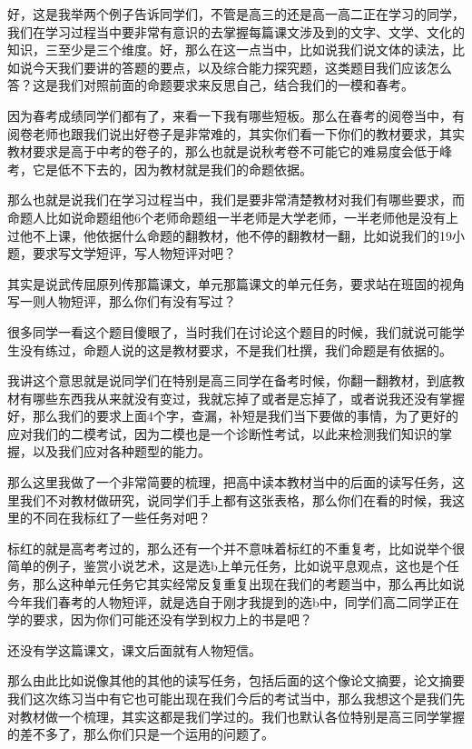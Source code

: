 \documentclass{ctexart}
\renewcommand{\\}{\par}
\begin{document}
好，这是我举两个例子告诉同学们，不管是高三的还是高一高二正在学习的同学，我们在学习过程当中要非常有意识的去掌握每篇课文涉及到的文字、文学、文化的知识，三至少是三个维度。好，那么在这一点当中，比如说我们说文体的读法，比如说今天我们要讲的答题的要点，以及综合能力探究题，这类题目我们应该怎么答？这是我们对照前面的命题要求来反思自己，结合我们的一模和春考。

因为春考成绩同学们都有了，来看一下我有哪些短板。那么在春考的阅卷当中，有阅卷老师也跟我们说出好卷子是非常难的，其实你们看一下你们的教材要求，其实教材要求是高于中考的卷子的，那么也就是说秋考卷不可能它的难易度会低于峰考，它是低不下去的，因为教材就是我们的命题依据。

那么也就是说我们在学习过程当中，我们是要非常清楚教材对我们有哪些要求，而命题人比如说命题组他6个老师命题组一半老师是大学老师，一半老师他是没有上过他不上课，他依据什么命题的翻教材，他不停的翻教材一翻，比如说我们的19小题，要求写文学短评，写人物短评对吧？

其实是说武传屈原列传那篇课文，单元那篇课文的单元任务，要求站在班固的视角写一则人物短评，那么你们有没有写过？

很多同学一看这个题目傻眼了，当时我们在讨论这个题目的时候，我们就说可能学生没有练过，命题人说的这是教材要求，不是我们杜撰，我们命题是有依据的。

我讲这个意思就是说同学们在特别是高三同学在备考时候，你翻一翻教材，到底教材有哪些东西我从来就没有变过，我就忘掉了或者是忘掉了，或者说我还没有掌握好，那么我们的要求上面4个字，查漏，补短是我们当下要做的事情，为了更好的应对我们的二模考试，因为二模也是一个诊断性考试，以此来检测我们知识的掌握，以及我们应对各种题型的能力。

那么这里我做了一个非常简要的梳理，把高中读本教材当中的后面的读写任务，这里我们不对教材做研究，说同学们手上都有这张表格，那么你们在看的时候，我这里的不同在我标红了一些任务对吧？

标红的就是高考考过的，那么还有一个并不意味着标红的不重复考，比如说举个很简单的例子，鉴赏小说艺术，这是选b上单元任务，比如说平息观点，这也是个任务，那么这种单元任务它其实经常反复重复出现在我们的考题当中，那么再比如说今年我们春考的人物短评，就是选自于刚才我提到的选b中，同学们高二同学正在学的要求，因为你们可能还没有学到权力上的书是吧？

还没有学这篇课文，课文后面就有人物短信。

那么由此比如说像其他的其他的读写任务，包括后面的这个像论文摘要，论文摘要我们这次练习当中有它也可能出现在我们今后的考试当中，那么我想这个是我们先对教材做一个梳理，其实这都是我们学过的。我们也默认各位特别是高三同学掌握的差不多了，那么你们只是一个运用的问题了。
\end{document}
